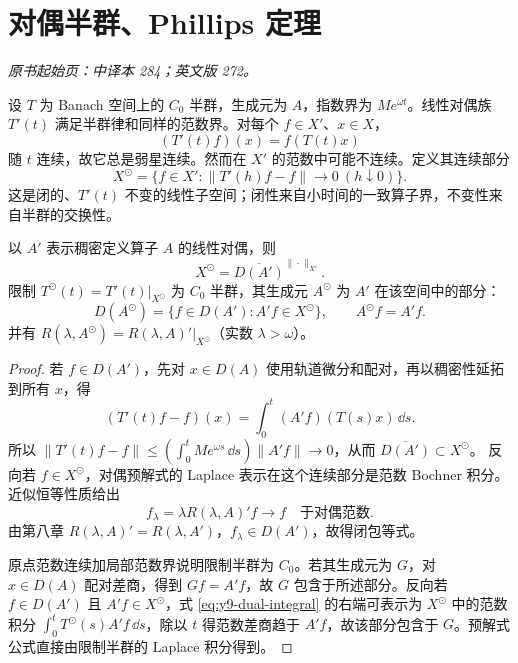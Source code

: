 \section{对偶半群、Phillips 定理}\label{sec:yosida-09-13}
\noindent\textit{原书起始页：中译本 284；英文版 272。}

设 $T$ 为 Banach 空间上的 $C_0$ 半群，生成元为 $A$，指数界为 $Me^{\omega t}$。线性对偶族 $T'(t)$ 满足半群律和同样的范数界。对每个 $f\in X'$、$x\in X$，
\[
 (T'(t)f)(x)=f(T(t)x)
\]
随 $t$ 连续，故它总是弱星连续。然而在 $X'$ 的范数中可能不连续。定义其连续部分
\begin{equation}\label{eq:y9-sun-dual}
 X^\odot=\{f\in X':\|T'(h)f-f\|\to0\ (h\downarrow0)\}.
\end{equation}
这是闭的、$T'(t)$ 不变的线性子空间；闭性来自小时间的一致算子界，不变性来自半群的交换性。

\begin{theorem}\label{thm:y9-phillips}
以 $A'$ 表示稠密定义算子 $A$ 的线性对偶，则
\begin{equation}\label{eq:y9-sun-domain}
 X^\odot=\overline{D(A')}^{\|\cdot\|_{X'}}.
\end{equation}
限制 $T^\odot(t)=T'(t)|_{X^\odot}$ 为 $C_0$ 半群，其生成元 $A^\odot$ 为 $A'$ 在该空间中的部分：
\begin{equation}\label{eq:y9-sun-generator}
 D(A^\odot)=\{f\in D(A'):A'f\in X^\odot\},\qquad A^\odot f=A'f.
\end{equation}
并有 $R(\lambda,A^\odot)=R(\lambda,A)'|_{X^\odot}$（实数 $\lambda>\omega$）。
\end{theorem}
\begin{proof}
若 $f\in D(A')$，先对 $x\in D(A)$ 使用轨道微分和配对，再以稠密性延拓到所有 $x$，得
\begin{equation}\label{eq:y9-dual-integral}
 (T'(t)f-f)(x)=\int_0^t(A'f)(T(s)x)\,\dd s.
\end{equation}
所以 $\|T'(t)f-f\|\le(\int_0^tMe^{\omega s}\,\dd s)\|A'f\|\to0$，从而 $\overline{D(A')}\subset X^\odot$。
反向若 $f\in X^\odot$，对偶预解式的 Laplace 表示在这个连续部分是范数 Bochner 积分。近似恒等性质给出
\[
 f_\lambda=\lambda R(\lambda,A)'f\longrightarrow f
 \quad\text{于对偶范数}.
\]
由第八章 $R(\lambda,A)'=R(\lambda,A')$，$f_\lambda\in D(A')$，故得闭包等式。

原点范数连续加局部范数界说明限制半群为 $C_0$。若其生成元为 $G$，对 $x\in D(A)$ 配对差商，得到 $Gf=A'f$，故 $G$ 包含于所述部分。反向若 $f\in D(A')$ 且 $A'f\in X^\odot$，式 \eqref{eq:y9-dual-integral} 的右端可表示为 $X^\odot$ 中的范数积分 $\int_0^tT^\odot(s)A'f\,\dd s$，除以 $t$ 得范数差商趋于 $A'f$，故该部分包含于 $G$。预解式公式直接由限制半群的 Laplace 积分得到。
\end{proof}

